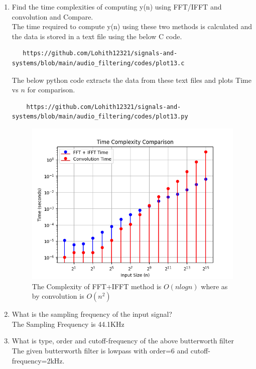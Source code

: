 \documentclass[journal,12pt,twocolumn]{IEEEtran}
\theoremstyle{remark}
\begin{document}
\begin{enumerate}[label=\thesection.\arabic*
,ref=\thesection.\theenumi]
\begin{enumerate}[label=\thesection.\arabic*
,ref=\thesection.\theenumi]
Before executing the python code. Execute the following command.
\begin{lstlisting}
    gcc −shared −o fft.so −fPIC fft.c
\end{lstlisting}
then execute this python code
\begin{lstlisting}
     https://github.com/Lohith12321/signals-and-systems/blob/main/audio_filtering/codes/fft.py
\end{lstlisting}
\item Find the time complexities of computing y(n)
using FFT/IFFT and convolution and Compare.\\
\solution The time required to compute y(n) using these two methods is calculated and the data is stored in a text file using the below C code.
\begin{lstlisting}
   https://github.com/Lohith12321/signals-and-systems/blob/main/audio_filtering/codes/plot13.c 
\end{lstlisting}
The below python code extracts the data from these text files and plots Time vs $n$ for comparison.
\begin{lstlisting}
    https://github.com/Lohith12321/signals-and-systems/blob/main/audio_filtering/codes/plot13.py
\end{lstlisting}
\begin{figure}[ht]
\centering
\includegraphics[width=1\columnwidth]{figs/plot13.png}
\caption{The Complexity of FFT+IFFT method is $ O(nlogn)$ where as by convolution is $O(n^2)$}
\label{fig:time_complexity}
\end{figure}
\item What is the sampling frequency of the input signal?\\
\solution The Sampling Frequency is 44.1KHz
\item
What is type, order and  cutoff-frequency of the above butterworth filter
\\
\solution The given butterworth filter is lowpass with order=6 and cutoff-frequency=2kHz.


\end{enumerate}
\end{enumerate}
\end{document}
